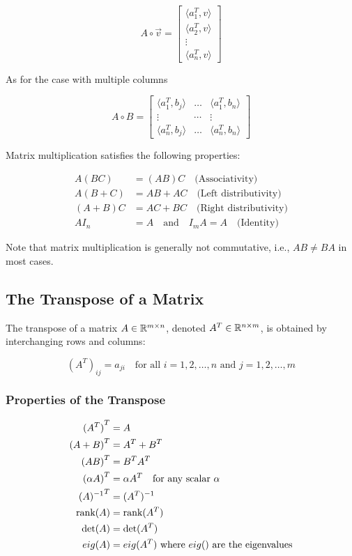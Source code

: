 \[
    A \circ \vec{v} = 
    \begin{bmatrix}
    \langle a_{1}^T, v\rangle \\
    \langle a_{2}^T, v\rangle \\
    \vdots \\
    \langle a_{n}^T, v\rangle 
    \end{bmatrix}
\]

As for the case with multiple columns

\[
    A \circ B = 
    \begin{bmatrix}
    \langle a_{1}^T, b_{j} \rangle & \dots  & \langle a_{1}^T, b_{n} \rangle \\
    \vdots                         & \cdots &              \vdots            \\
    \langle a_{n}^T, b_{j} \rangle & \dots  & \langle a_{n}^T, b_{n} \rangle 
    \end{bmatrix}
\]

Matrix multiplication satisfies the following properties:

\begin{align*}
    A(BC) &= (AB)C \quad \text{(Associativity)} \\
    A(B+C) &= AB + AC \quad \text{(Left distributivity)} \\
    (A+B)C &= AC + BC \quad \text{(Right distributivity)} \\
    AI_n &= A \quad \text{and} \quad I_m A = A \quad \text{(Identity)}
\end{align*}

Note that matrix multiplication is generally not commutative, i.e., \(AB \neq BA\) in most cases.

\subsection{The Transpose of a Matrix}

The transpose of a matrix \(A \in \mathbb{R}^{m \times n}\), denoted \(A^T \in \mathbb{R}^{n \times m}\), is obtained by interchanging rows and columns:

\[
    {(A^T)}_{ij} = a_{ji} \quad \text{for all } i = 1, 2, \ldots, n \text{ and } j = 1, 2, \ldots, m
\]

\subsubsection{Properties of the Transpose}

\begin{align*}
    {(A^T)}^T &= A \\
    {(A + B)}^T &= A^T + B^T \\
    {(AB)}^T &= B^T A^T \\
    {(\alpha A)}^T &= \alpha A^T \quad \text{for any scalar } \alpha \\
    {(A)^{-1}}^T &= (A^T)^{-1} \\
    \text{rank}(A) &= \text{rank}(A^T) \\
    \det(A) &= \det(A^T) \\
    eig(A) &= eig(A^T) \text{ where } eig() \text{ are the eigenvalues}
\end{align*}

